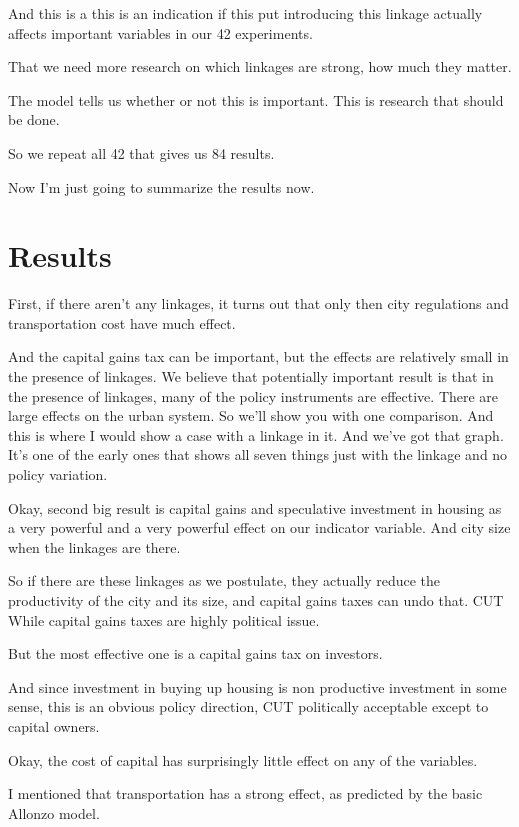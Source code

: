 \documentclass[]{article}
\begin{document}
And this is a this is an indication if this put introducing this linkage actually affects important variables in our 42 experiments.

That we need more research on which linkages are strong, how much they matter.

The model tells us whether or not this is important. This is research that should be done.

So we repeat all 42 that gives us 84 results.

Now I'm just going to summarize the results now.

\section{Results}

First, if there aren't any linkages, it turns out that only then city regulations and transportation cost have much effect.

And the capital gains tax can be important, but the effects are relatively small in the presence of linkages. We believe that potentially important result is that in the presence of linkages, many of the policy instruments are effective.
There are large effects on the urban system. So we'll show you with one comparison. And this is where I would show a case with a linkage in it. And we've got that graph. It's one of the early ones that shows all seven things just with the linkage and no policy variation. 

Okay, second big result is capital gains and speculative investment in housing as a very powerful and a very powerful effect on our indicator variable. And city size when the linkages are there.


So if there are these linkages as we postulate, they actually reduce the productivity of the city and its size, and capital gains taxes can undo that. CUT While capital gains taxes are highly political issue.


But the most effective one is a capital gains tax on investors.


And since investment in buying up housing is non productive investment in some sense, this is an obvious policy direction, CUT politically acceptable except to capital owners.

Okay, the cost of capital has surprisingly little effect on any of the variables. 

I mentioned that transportation has a strong effect, as predicted by the basic Allonzo model. 
\end{document}
